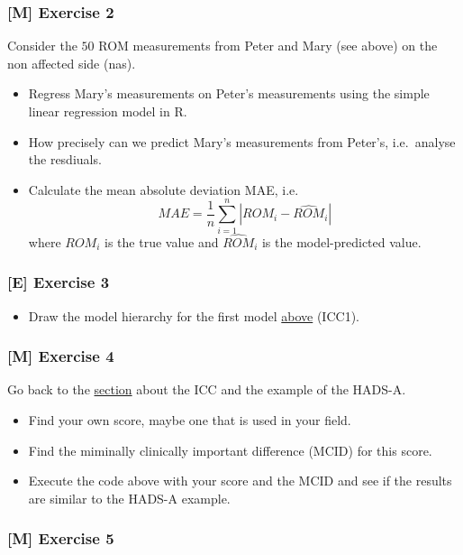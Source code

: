 \documentclass[
]{article}
\providecommand{\tightlist}{%
  \setlength{\itemsep}{0pt}\setlength{\parskip}{0pt}}
\begin{document}
\subsubsection{{[}M{]} Exercise 2}\label{exercise2}

Consider the \(50\) ROM measurements from Peter and Mary (see above) on the non affected side (nas).

\begin{itemize}
\tightlist
\item
  Regress Mary's measurements on Peter's measurements using the simple
  linear regression model in R.
\item
  How precisely can we predict Mary's measurements from Peter's, i.e.~analyse the resdiuals.
\item
  Calculate the mean absolute deviation MAE, i.e.~
  \[MAE = \frac{1}{n} \sum_{i=1}^n |ROM_i - \widehat{ROM}_i|\]
  where \(ROM_i\) is the true value and \(\widehat{ROM}_i\) is the model-predicted value.
\end{itemize}

\subsubsection{{[}E{]} Exercise 3}\label{exercise3}

\begin{itemize}
\tightlist
\item
  Draw the model hierarchy for the first model \hyperref[ICC]{above} (ICC1).
\end{itemize}

\subsubsection{{[}M{]} Exercise 4}\label{exercise4}

Go back to the \hyperref[badnews]{section} about the ICC and the example of the HADS-A.

\begin{itemize}
\tightlist
\item
  Find your own score, maybe one that is used in your field.
\item
  Find the miminally clinically important difference (MCID) for this score.
\item
  Execute the code above with your score and the MCID and see if
  the results are similar to the HADS-A example.
\end{itemize}

\subsubsection{{[}M{]} Exercise 5}\label{exercise5}
\end{document}
